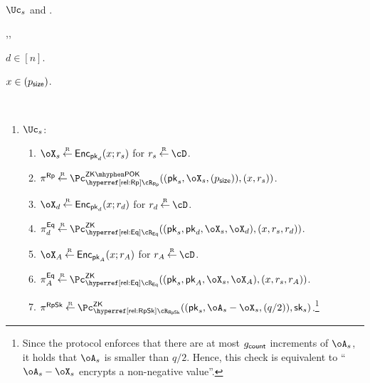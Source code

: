 \begin{protocol}~\label{prot:ConfidentialTransactions:Transfer}
	\item[Parties:] $\Uc_s$ and \Cc.
	
\item[Proofs:]   \piZKPOK{\rRp},\piZK{\rRpSk},\piZK{\rEq}



	
	\item[Common input:] $d\in [n]$. 
	
	\item[$\Uc_s$'s private  input:] $x \in (p_{\mathsf{size}})$.
	
\item[Operation:] ~
	

	
	\begin{enumerate}
		\item  $\Uc_s$: 
		
		\begin{enumerate}
			\item $\oX_s \getsr \Enc_{\pk_d}(x;r_s)$ for $r_s \getsr \cD$.
			
		
			\item $\pi^\RPs \getsr \pZKPOK{\rRp}((\pk_s,\oX_s,(\psizeCns)),(x,r_s))$.
			
			
			\item $\oX_d \getsr \Enc_{\pk_d}(x;r_d)$ for $r_d \getsr \cD$.
			
			
			
		\item $\pi^\Eqs_d \getsr \pZK{\rEq}((\pk_s,\pk_d,\oX_s, \oX_d),(x,r_s,r_d))$.
			
			
			\item $\oX_A \getsr \Enc_{\pk_A}(x;r_A)$ for $r_A \getsr \cD$.
		
			\item $\pi^\Eqs_A \getsr \pZK{\rEq}((\pk_s,\pk_A,\oX_s, \oX_A),(x,r_s,r_A))$.
		
		
			
		
			
		\item $\pi^\RpSkS \getsr \pZK{\rRpSk}((\pk_s,\oA_s- \oX_s, (q/2)),\sk_s)$.\footnote{Since  the protocol enforces that there  are at most  $g_{\mathsf{count}}$  increments of $\oA_s$, it holds that  $\oA_s$ is smaller than $q/2$. Hence, this check is equivalent to ``$\oA_s- \oX_s$ encrypts a non-negative value''.} 
			

\end{enumerate}
\end{enumerate}
\end{protocol}

